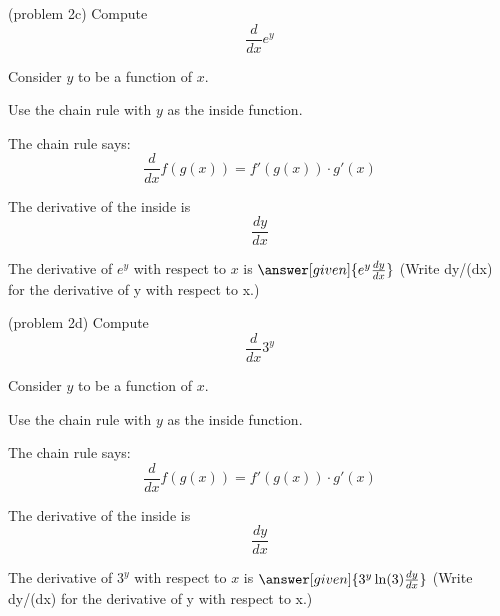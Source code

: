 \documentclass{ximera}
\begin{document}
\begin{problem}(problem 2c)
  Compute
  \[
  \frac{d}{dx} e^y
  \]
  
	  
    \begin{hint}
      Consider $y$ to be a function of $x$.
    \end{hint}
    \begin{hint}
      Use the chain rule with $y$ as the inside function.
    \end{hint}
    \begin{hint}
      The chain rule says:
      \[
      \frac{d}{dx} f(g(x)) = f'(g(x))\cdot g'(x)
      \]
    \end{hint}
    \begin{hint}
      The derivative of the inside is 
      \[
      \frac{dy}{dx}
      \]
    \end{hint}
    
		The derivative of $e^y$ with respect to $x$ is
		 $\answer[given]{e^y \frac{dy}{dx}}$  (Write dy/(dx) for the derivative of y with respect to x.)
		
\end{problem}


\begin{problem}(problem 2d)
  Compute
  \[
  \frac{d}{dx} 3^y
  \]
  
	  
    \begin{hint}
      Consider $y$ to be a function of $x$.
    \end{hint}
    \begin{hint}
      Use the chain rule with $y$ as the inside function.
    \end{hint}
    \begin{hint}
      The chain rule says:
      \[
      \frac{d}{dx} f(g(x)) = f'(g(x))\cdot g'(x)
      \]
    \end{hint}
    \begin{hint}
      The derivative of the inside is 
      \[
      \frac{dy}{dx}
      \]
    \end{hint}
    
		The derivative of $3^y$ with respect to $x$ is
		 $\answer[given]{3^y \ln(3) \frac{dy}{dx}}$  (Write dy/(dx) for the derivative of y with respect to x.)
		
\end{problem}
\end{document}

